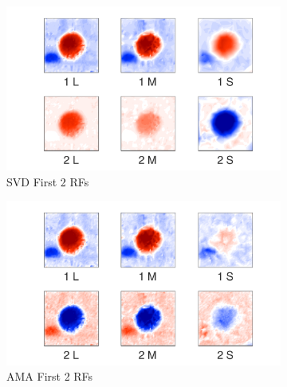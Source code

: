 \documentclass{jov}
\begin{document}
\begin{figure}
\centering
\begin{subfigure}[b]{0.27 \textwidth}
		\centering
        \includegraphics[width=\textwidth]{../Figures/Figure4/Figure4_a.pdf}
        \caption{SVD First 2 RFs}
        \label{fig:case9SVD}
    \end{subfigure}
    \begin{subfigure}[b]{0.27 \textwidth}   
        \includegraphics[width=\textwidth]{../Figures/Figure4/Figure4_b.pdf}
        \caption{AMA First 2 RFs}
        \label{fig:case9AMA}
    \end{subfigure}
        \begin{subfigure}[b]{0.20 \textwidth}

\end{subfigure}
\end{figure}
\end{document}
